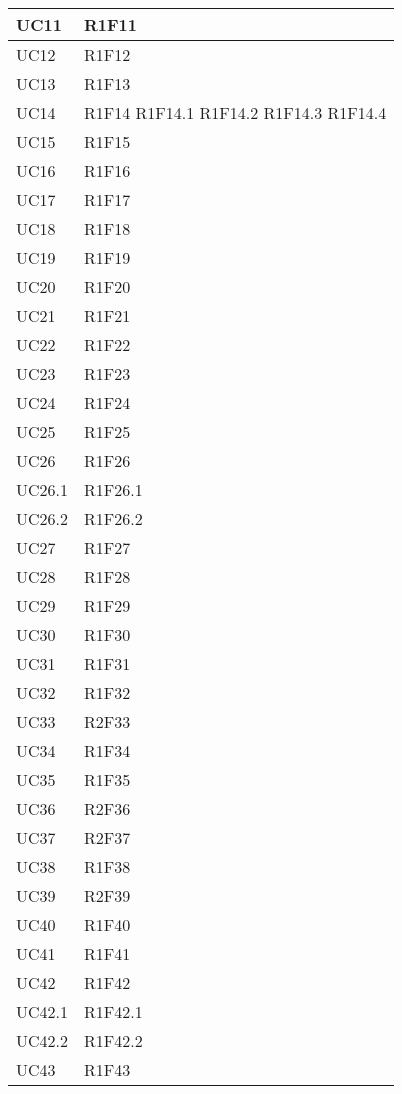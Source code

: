 \begin{center}
\begin{longtable}{|p{44mm}|p{22mm}|}
\hline
UC11 &
R1F11 
\\
\hline
UC12 &
R1F12 
\\
\hline
UC13 &
R1F13 
\\
\hline
UC14 &
R1F14 \newline
R1F14.1 \newline
R1F14.2 \newline
R1F14.3 \newline
R1F14.4 
\\
\hline
UC15 &
R1F15 
\\
\hline
UC16 &
R1F16 
\\
\hline
UC17 &
R1F17 
\\
\hline
UC18 &
R1F18 
\\
\hline
UC19 &
R1F19 
\\
\hline
UC20 &
R1F20 
\\
\hline
UC21 &
R1F21 
\\
\hline
UC22 &
R1F22 
\\
\hline
UC23 &
R1F23 
\\
\hline
UC24 &
R1F24 
\\
\hline
UC25 &
R1F25 
\\
\hline
UC26 &
R1F26 
\\
\hline
UC26.1 &
R1F26.1 
\\
\hline
UC26.2 &
R1F26.2 
\\
\hline
UC27 &
R1F27 
\\
\hline
UC28 &
R1F28 
\\
\hline
UC29 &
R1F29 
\\
\hline
UC30 &
R1F30 
\\
\hline
UC31 &
R1F31 
\\
\hline
UC32 &
R1F32 
\\
\hline
UC33 &
R2F33 
\\
\hline
UC34 &
R1F34 
\\
\hline
UC35 &
R1F35 
\\
\hline
UC36 &
R2F36 
\\
\hline
UC37 &
R2F37 
\\
\hline
UC38 &
R1F38 
\\
\hline
UC39 &
R2F39 
\\
\hline
UC40 &
R1F40 
\\
\hline
UC41 &
R1F41 
\\
\hline
UC42 &
R1F42 
\\
\hline
UC42.1 &
R1F42.1 
\\
\hline
UC42.2 &
R1F42.2 
\\
\hline
UC43 &
R1F43 
\\

\end{longtable}
\end{center}
